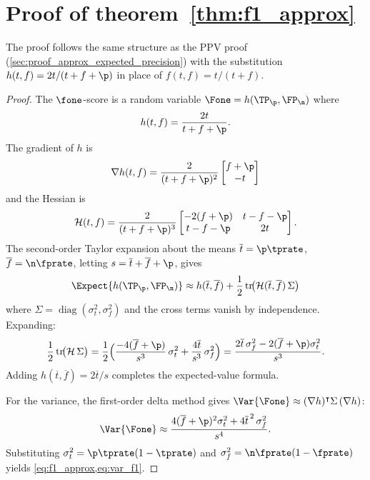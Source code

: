 \section{Proof of theorem~\ref{thm:f1_approx}}
\label{sec:proof_f1}
The proof follows the same structure as the PPV proof (\cref{sec:proof_approx_expected_precision}) with the substitution $h(t,f) = 2t/(t + f + \p)$ in place of $f(t,f) = t/(t+f)$.
\begin{proof}
The $\fone$-score is a random variable $\Fone = h(\TP_\p, \FP_\n)$ where
\begin{equation}
    h(t, f) = \frac{2t}{t + f + \p}.
\end{equation}
The gradient of $h$ is
\begin{equation}
    \nabla h(t,f) =
    \frac{2}{(t + f + \p)^2}
    \begin{bmatrix}
        f + \p\\
        -t\\
    \end{bmatrix}
\end{equation}
and the Hessian is
\begin{equation}
    \mathcal{H}(t,f) =
    \frac{2}{(t + f + \p)^3}
    \begin{bmatrix}
        -2(f+\p) & t - f - \p\\
        t - f - \p & 2 t \\
    \end{bmatrix}.
\end{equation}
The second-order Taylor expansion about the means $\overline{t} = \p\tprate$, $\overline{f} = \n\fprate$, letting $s = \overline{t} + \overline{f} + \p$, gives
\begin{equation}
    \Expect{h(\TP_\p, \FP_\n)} \approx h(\overline{t}, \overline{f}) + \frac{1}{2}\operatorname{tr}\!\bigl(\mathcal{H}(\overline{t},\overline{f})\,\Sigma\bigr)
\end{equation}
where $\Sigma = \operatorname{diag}(\sigma_t^2, \sigma_f^2)$ and the cross terms vanish by independence.
Expanding:
\begin{equation}
    \frac{1}{2}\operatorname{tr}\!\bigl(\mathcal{H}\,\Sigma\bigr) =
    \frac{1}{2}\Bigl(\frac{-4(\overline{f}+\p)}{s^3}\,\sigma_t^2 +
    \frac{4\overline{t}}{s^3}\,\sigma_f^2\Bigr) =
    \frac{2\overline{t}\,\sigma_f^2 - 2(\overline{f}+\p)\sigma_t^2}{s^3}.
\end{equation}
Adding $h(\overline{t},\overline{f}) = 2\overline{t}/s$ completes the expected-value formula.

For the variance, the first-order delta method gives $\Var{\Fone} \approx (\nabla h)^\intercal \Sigma\,(\nabla h)$:
\begin{equation}
    \Var{\Fone} \approx \frac{4(\overline{f}+\p)^2 \sigma_t^2 + 4\overline{t}^{\,2}\,\sigma_f^2}{s^4}.
\end{equation}
Substituting $\sigma_t^2 = \p\tprate(1-\tprate)$ and $\sigma_f^2 = \n\fprate(1-\fprate)$ yields \cref{eq:f1_approx,eq:var_f1}.
\end{proof}

